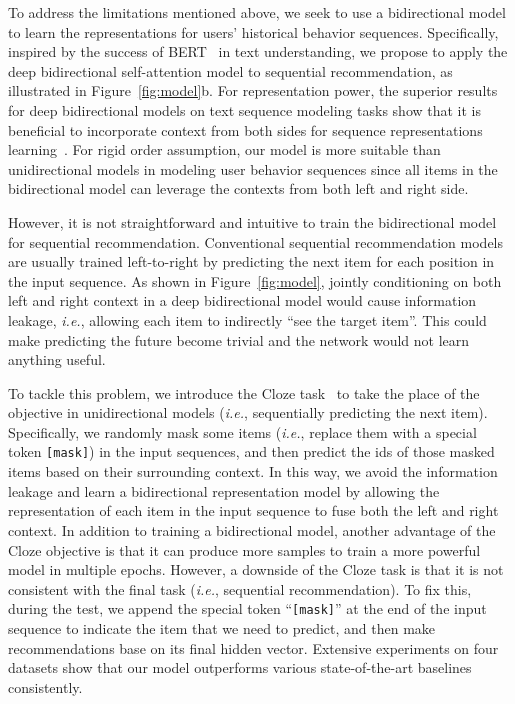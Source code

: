 To address the limitations mentioned above, we seek to use a bidirectional model to learn the representations for users' historical behavior sequences.
Specifically, inspired by the success of BERT~\cite{Devlin:2018:BERT} in text understanding, we propose to apply the deep bidirectional self-attention model to sequential recommendation, as illustrated in Figure~\ref{fig:model}b. 
For representation power, the superior results for deep bidirectional models on text sequence modeling tasks show that it is beneficial to incorporate context from both sides for sequence representations learning~\cite{Devlin:2018:BERT}.
For rigid order assumption, our model is more suitable than unidirectional models in modeling user behavior sequences since all items in the bidirectional model can leverage the contexts from both left and right side.


However, it is not straightforward and intuitive to train the bidirectional model for sequential recommendation. %
Conventional sequential recommendation models are usually trained left-to-right by predicting the next item for each position in the input sequence.
As shown in Figure~\ref{fig:model}, jointly conditioning on both left and right context in a deep bidirectional model would cause information leakage, \textit{i.e.}, allowing each item to indirectly ``see the target item''.
This could make predicting the future become trivial and the network would not learn anything useful.

To tackle this problem, we introduce the Cloze task~\cite{Devlin:2018:BERT,Wilson:Cloze} to take the place of the objective in unidirectional models (\textit{i.e.}, sequentially predicting the next item).
Specifically, we randomly mask some items (\textit{i.e.}, replace them with a special token \texttt{[mask]}) in the input sequences, and then predict the ids of those masked items based on their surrounding context. %
In this way, we avoid the information leakage and learn a bidirectional representation model by allowing the representation of each item in the input sequence to fuse both the left and right context.
In addition to training a bidirectional model, another advantage of the Cloze objective is that it can produce more samples to train a more powerful model in multiple epochs. %
However, a downside of the Cloze task is that it is not consistent with the final task (\textit{i.e.}, sequential recommendation).
To fix this, during the test, we append the special token ``\texttt{[mask]}'' at the end of the input sequence to indicate the item that we need to predict, and then make recommendations base on its final hidden vector.
Extensive experiments on four datasets show that our model outperforms various state-of-the-art baselines consistently.

